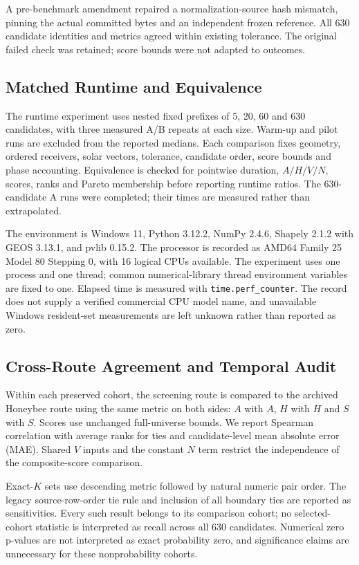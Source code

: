 \documentclass{llncs}
\begin{document}
A pre-benchmark amendment repaired a normalization-source hash mismatch, pinning the actual committed bytes and an independent frozen reference. All 630 candidate identities and metrics agreed within existing tolerance. The original failed check was retained; score bounds were not adapted to outcomes.

\subsection{Matched Runtime and Equivalence}
The runtime experiment uses nested fixed prefixes of 5, 20, 60 and 630 candidates, with three measured A/B repeats at each size. Warm-up and pilot runs are excluded from the reported medians. Each comparison fixes geometry, ordered receivers, solar vectors, tolerance, candidate order, score bounds and phase accounting. Equivalence is checked for pointwise duration, $A/H/V/N$, scores, ranks and Pareto membership before reporting runtime ratios. The 630-candidate A runs were completed; their times are measured rather than extrapolated.

The environment is Windows 11, Python 3.12.2, NumPy 2.4.6, Shapely 2.1.2 with GEOS 3.13.1, and pvlib 0.15.2. The processor is recorded as AMD64 Family 25 Model 80 Stepping 0, with 16 logical CPUs available. The experiment uses one process and one thread; common numerical-library thread environment variables are fixed to one. Elapsed time is measured with \texttt{time.perf\_counter}. The record does not supply a verified commercial CPU model name, and unavailable Windows resident-set measurements are left unknown rather than reported as zero.

\subsection{Cross-Route Agreement and Temporal Audit}
Within each preserved cohort, the screening route is compared to the archived Honeybee route using the same metric on both sides: $A$ with $A$, $H$ with $H$ and $S$ with $S$. Scores use unchanged full-universe bounds. We report Spearman correlation with average ranks for ties and candidate-level mean absolute error (MAE). Shared $V$ inputs and the constant $N$ term restrict the independence of the composite-score comparison.

Exact-$K$ sets use descending metric followed by natural numeric pair order. The legacy source-row-order tie rule and inclusion of all boundary ties are reported as sensitivities. Every such result belongs to its comparison cohort; no selected-cohort statistic is interpreted as recall across all 630 candidates. Numerical zero p-values are not interpreted as exact probability zero, and significance claims are unnecessary for these nonprobability cohorts.
\end{document}
